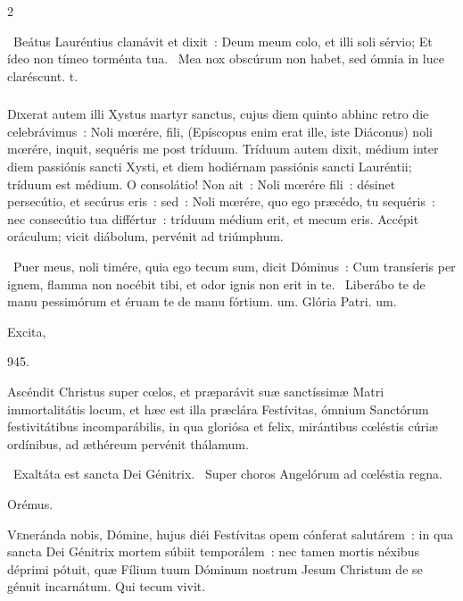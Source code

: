 \documentclass[9pt,twoside]{extarticle}
\begin{document}
\begin{multicols}{2}
{\begin{tightlist}{}
\item {}~Beátus Lauréntius clamávit et dixit~: Deum meum colo, et illi soli sérvio; \textred{*} Et ídeo non tímeo torménta tua.
~Mea nox obscúrum non habet, sed ómnia in luce claréscunt. t.
\end{tightlist}

\subsubsection*{\center {}}
\lettrine{D}ixerat autem illi Xystus martyr sanctus, cujus diem quinto abhinc retro die celebrávimus~: Noli mœrére, fili, (Epíscopus enim erat ille, iste Diáconus) noli mœrére, inquit, sequéris me post tríduum. Tríduum autem dixit, médium inter diem passiónis sancti Xysti, et diem hodiérnam passiónis sancti Lauréntii; tríduum est médium. O consolátio! Non ait~: Noli mœrére fili~: désinet persecútio, et secúrus eris~: sed~: Noli mœrére, quo ego præcédo, tu sequéris~: nec consecútio tua différtur~: tríduum médium erit, et mecum eris. Accépit oráculum; vicit diábolum, pervénit ad triúmphum.

\begin{tightlist}{}
\item {}~Puer meus, noli timére, quia ego tecum sum, dicit Dóminus~: \textred{*} Cum transíeris per ignem, flamma non nocébit tibi, et odor ignis non erit in te.
~Liberábo te de manu pessimórum et éruam te de manu fórtium. um. Glória Patri. um.
\item {}
\item {} Excita, 
\item {} 945.
\item {} Ascéndit Christus super cœlos, et præparávit suæ sanctíssimæ Matri immortalitátis locum, et hæc est illa præclára Festívitas, ómnium Sanctórum festivitátibus incomparábilis, in qua gloriósa et felix, mirántibus cœléstis cúriæ ordínibus, ad æthéreum pervénit thálamum.
\item {}~Exaltáta est sancta Dei Génitrix. ~Super choros Angelórum ad cœléstia regna.
\item Orémus. \hfill {}
\end{tightlist}
\lettrine{V}eneránda nobis, Dómine, hujus diéi Festívitas opem cónferat salutárem~: in qua sancta Dei Génitrix mortem súbiit temporálem~: nec tamen mortis néxibus déprimi pótuit, quæ Fílium tuum Dóminum nostrum Jesum Christum de se génuit incarnátum. Qui tecum vivit.

}
\end{multicols}
\end{document}
